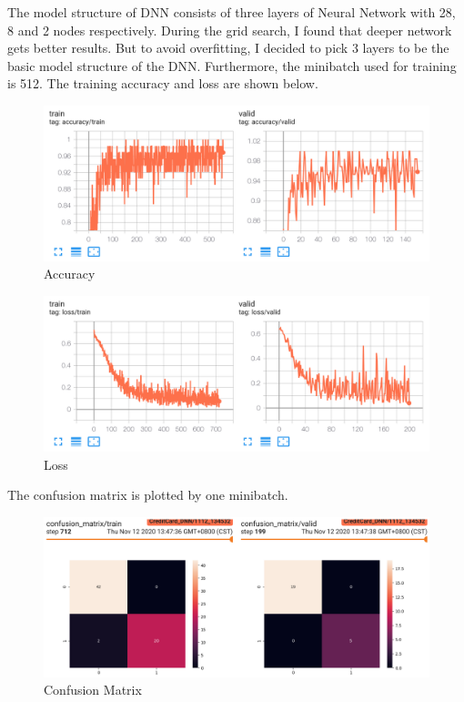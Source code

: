 \documentclass{../../Latex_Template/Homework/homework}
\begin{document}
\maketitle

  \begin{alphaparts}
    \questionpart
    The model structure of DNN consists of three layers of Neural Network with
    28, 8 and 2 nodes respectively. During the grid search, I found that deeper
    network gets better results. But to avoid overfitting, I decided to pick 3
    layers to be the basic model structure of the DNN. Furthermore, the
    minibatch used for training is 512. The training accuracy and loss are shown
    below. 
    \begin{figure}[h]
      \centering
      \includegraphics[width=0.5\linewidth]{Accuracy.png}
      \caption{Accuracy}
      \label{fig:accuracy}
    \end{figure}
        
    \begin{figure}[h]
      \centering
      \includegraphics[width=0.5\linewidth]{Loss.png}
      \caption{Loss}
      \label{fig:loss}
    \end{figure}
        
    \questionpart
    The confusion matrix is plotted by one minibatch.
    \begin{figure}[h]
      \centering
      \includegraphics[width=0.5\linewidth]{Confusion_Matrix.png}
      \caption{Confusion Matrix}
      \label{fig:confusion_matrix}
    \end{figure}
        

\end{alphaparts}
\end{document}
